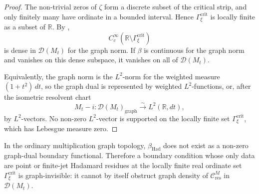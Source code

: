 \begin{proof}
The non-trivial zeros of \(\zeta\) form a discrete subset of the
critical strip, and only finitely many have ordinate in a bounded
interval. Hence \(\Gamma_{\xi}^{\mathrm{crit}}\) is locally finite as a subset of
\(\mathbb R\). By
,
\[
C_c^\infty(\mathbb R\setminus\Gamma_{\xi}^{\mathrm{crit}})
\]
is dense in \(\mathcal{D}(M_t)\) for the graph norm. If
\(\beta\) is continuous for the graph norm and vanishes on this dense
subspace, it vanishes on all of \(\mathcal{D}(M_t)\).

Equivalently, the graph norm is the \(L^2\)-norm for the weighted
measure \((1+t^2)\,dt\), so the graph dual is represented by weighted
\(L^2\)-functions, or, after the isometric resolvent chart
\[
M_t-i\colon \mathcal{D}(M_t)_{\mathrm{graph}}\xrightarrow{\sim}
L^2(\mathbb R,dt),
\]
by \(L^2\)-vectors. No non-zero \(L^2\)-vector is supported on the
locally finite set \(\Gamma_{\xi}^{\mathrm{crit}}\), which has Lebesgue measure zero.
\end{proof}

\begin{corollary}
\label{v4-arith:w9-r4:cor:beta-had-no-go}
\ClaimStatusProvedHere In the ordinary multiplication graph topology,
\(\beta_{\mathrm{Had}}\) does not exist as a non-zero graph-dual
boundary functional. Therefore a boundary condition whose only data are
point or finite-jet Hadamard residues at the locally finite real
ordinate set \(\Gamma_{\xi}^{\mathrm{crit}}\) is graph-invisible: it
cannot by itself obstruct graph density of
\(\mathcal{C}_{\mathrm{res}}^{M}\) in \(\mathcal{D}(M_t)\).
\end{corollary}

